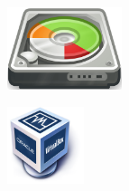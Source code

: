 \documentclass[aspectratio=43]{beamer}
\begin{document}
\begin{frame}{\secname}{\subsecname}
        \begin{multicols}{2}
            \begin{figure}
                \centering
                \includegraphics[width=0.3\textwidth]{img/gparted.png}
            \end{figure}
            \begin{figure}
                \centering
                \includegraphics[width=0.2\textwidth]{img/virtualbox.png}
            \end{figure}
        \end{multicols}
    \end{frame}
\end{document}
